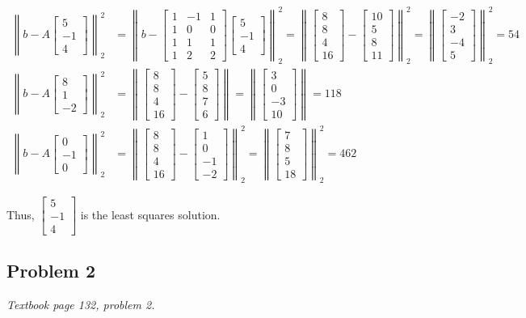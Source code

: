 \documentclass[11pt]{article}
\providecommand{\qbm}[1]{\begin{bmatrix} #1 \end{bmatrix}}
\providecommand{\norm}[1]{\left\lVert #1 \right\rVert}
\begin{document}
\begin{align*}
    \norm{b - A \qbm{5 \\ -1 \\4}}_2^2 &= \norm{b - \qbm{1 & -1 & 1 \\ 1 & 0 & 0 \\ 1 & 1 & 1 \\ 1 & 2 & 2} \qbm{5 \\ -1 \\4}}_2^2 = \norm{\qbm{8 \\ 8 \\ 4 \\ 16} - \qbm{10 \\ 5 \\ 8 \\ 11}}_2^2= \norm{\qbm{-2 \\ 3 \\ -4 \\5}}_2^2 = 54 \\
    \norm{b - A \qbm{8 \\ 1 \\-2}}_2^2 &= \norm{\qbm{8 \\ 8 \\ 4 \\ 16} - \qbm{5 \\ 8 \\ 7 \\ 6}} = \norm{\qbm{3 \\ 0 \\ -3 \\ 10}} = 118 \\
    \norm{b - A \qbm{0 \\ -1 \\ 0}}_2^2 &= \norm{\qbm{8 \\ 8 \\ 4 \\ 16} - \qbm{1 \\ 0 \\ -1 \\ -2}}_2^2 = \norm{\qbm{7 \\ 8 \\ 5 \\ 18}}_2^2 = 462
\end{align*}

Thus, $\qbm{5 \\ -1 \\ 4}$ is the least squares solution.


\subsection*{Problem 2}
\textit{Textbook page 132, problem 2.}\newline
\end{document}

